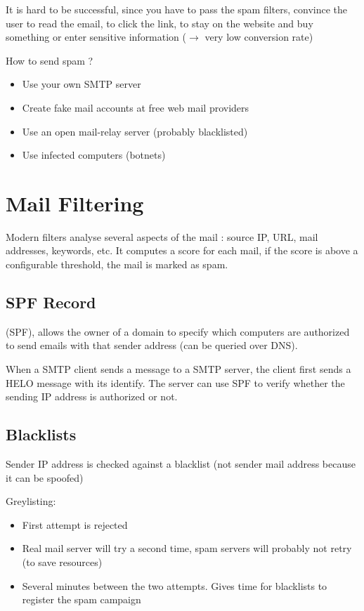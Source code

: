 It is hard to be successful, since you have to pass the spam filters, convince the user to read the email, to click the link, to stay on the website and buy something or enter sensitive information ($\rightarrow$ very low conversion rate)

How to send spam ?
\begin{itemize}
    \item Use your own SMTP server
    \item Create fake mail accounts at free web mail providers
    \item Use an open mail-relay server (probably blacklisted)
    \item Use infected computers (botnets)
\end{itemize}

\section{Mail Filtering}

Modern filters analyse several aspects of the mail : source IP, URL, mail addresses, keywords, etc. It computes a score for each mail, if the score is above a configurable threshold, the mail is marked as spam.

\subsection{SPF Record}

 (SPF), allows the owner of a domain to specify which computers are authorized to send emails with that sender address (can be queried over DNS).

When a SMTP client sends a message to a SMTP server, the client first sends a HELO message with its identify. The server can use SPF to verify whether the sending IP address is authorized or not.

\subsection{Blacklists}

Sender IP address is checked against a blacklist (not sender mail address because it can be spoofed)

Greylisting:
\begin{itemize}
    \item First attempt is rejected
    \item Real mail server will try a second time, spam servers will probably not retry (to save resources)
    \item Several minutes between the two attempts. Gives time for blacklists to register the spam campaign
\end{itemize}

